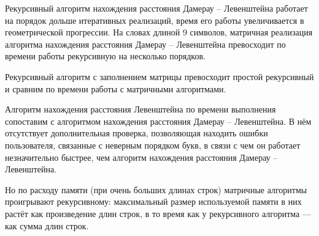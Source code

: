 Рекурсивный алгоритм нахождения расстояния Дамерау -- Левенштейна работает на порядок дольше итеративных реализаций, время его работы увеличивается в геометрической прогрессии. На словах длиной 9 символов, матричная реализация алгоритма нахождения расстояния Дамерау -- Левенштейна превосходит по времени работы рекурсивную на несколько порядков.

Рекурсивный алгоритм с заполнением матрицы превосходит простой рекурсивный и сравним по времени работы с матричными алгоритмами. 

Алгоритм нахождения расстояния Левенштейна по времени выполнения сопоставим с алгоритмом нахождения расстояния Дамерау -- Левенштейна. В нём отсутствует дополнительная проверка, позволяющая находить ошибки пользователя, связанные с неверным порядком букв, в связи с чем он работает незначительно быстрее, чем алгоритм нахождения расстояния Дамерау -- Левенштейна.

Но по расходу памяти (при очень больших длинах строк) матричные алгоритмы проигрывают рекурсивному: максимальный размер используемой памяти в них растёт как произведение длин строк, в то время как у рекурсивного алгоритма — как сумма длин строк.
